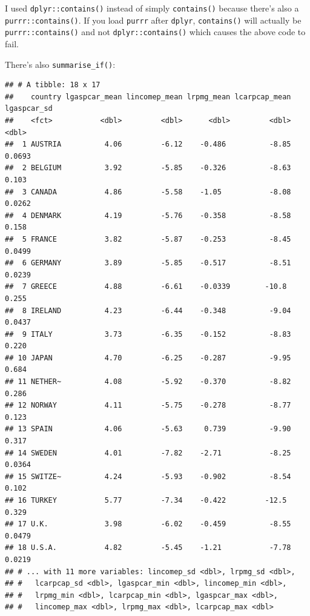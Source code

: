 \documentclass[]{gitbook}
\newenvironment{Shaded}{\begin{snugshade}}{\end{snugshade}}
\newcommand{\KeywordTok}[1]{\textcolor[rgb]{0.13,0.29,0.53}{\textbf{#1}}}
\newcommand{\NormalTok}[1]{#1}
\newcommand{\OperatorTok}[1]{\textcolor[rgb]{0.81,0.36,0.00}{\textbf{#1}}}
\newcommand{\StringTok}[1]{\textcolor[rgb]{0.31,0.60,0.02}{#1}}
\begin{document}
I used \texttt{dplyr::contains()} instead of simply \texttt{contains()} because there's also a
\texttt{purrr::contains()}. If you load \texttt{purrr} after \texttt{dplyr}, \texttt{contains()} will actually be
\texttt{purrr::contains()} and not \texttt{dplyr::contains()} which causes the above code to fail.

There's also \texttt{summarise\_if()}:

\begin{Shaded}
\end{Shaded}

\begin{verbatim}
## # A tibble: 18 x 17
##    country lgaspcar_mean lincomep_mean lrpmg_mean lcarpcap_mean lgaspcar_sd
##    <fct>           <dbl>         <dbl>      <dbl>         <dbl>       <dbl>
##  1 AUSTRIA          4.06         -6.12    -0.486          -8.85      0.0693
##  2 BELGIUM          3.92         -5.85    -0.326          -8.63      0.103 
##  3 CANADA           4.86         -5.58    -1.05           -8.08      0.0262
##  4 DENMARK          4.19         -5.76    -0.358          -8.58      0.158 
##  5 FRANCE           3.82         -5.87    -0.253          -8.45      0.0499
##  6 GERMANY          3.89         -5.85    -0.517          -8.51      0.0239
##  7 GREECE           4.88         -6.61    -0.0339        -10.8       0.255 
##  8 IRELAND          4.23         -6.44    -0.348          -9.04      0.0437
##  9 ITALY            3.73         -6.35    -0.152          -8.83      0.220 
## 10 JAPAN            4.70         -6.25    -0.287          -9.95      0.684 
## 11 NETHER~          4.08         -5.92    -0.370          -8.82      0.286 
## 12 NORWAY           4.11         -5.75    -0.278          -8.77      0.123 
## 13 SPAIN            4.06         -5.63     0.739          -9.90      0.317 
## 14 SWEDEN           4.01         -7.82    -2.71           -8.25      0.0364
## 15 SWITZE~          4.24         -5.93    -0.902          -8.54      0.102 
## 16 TURKEY           5.77         -7.34    -0.422         -12.5       0.329 
## 17 U.K.             3.98         -6.02    -0.459          -8.55      0.0479
## 18 U.S.A.           4.82         -5.45    -1.21           -7.78      0.0219
## # ... with 11 more variables: lincomep_sd <dbl>, lrpmg_sd <dbl>,
## #   lcarpcap_sd <dbl>, lgaspcar_min <dbl>, lincomep_min <dbl>,
## #   lrpmg_min <dbl>, lcarpcap_min <dbl>, lgaspcar_max <dbl>,
## #   lincomep_max <dbl>, lrpmg_max <dbl>, lcarpcap_max <dbl>
\end{verbatim}
\end{document}

